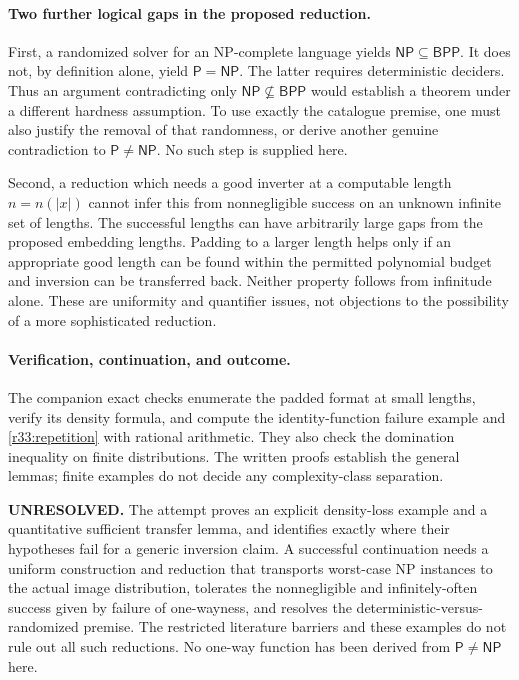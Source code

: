 \documentclass[11pt]{article}
\begin{document}
\paragraph{Two further logical gaps in the proposed reduction.}
First, a randomized solver for an NP-complete language yields
$\mathsf{NP}\subseteq\mathsf{BPP}$. It does not, by definition alone, yield
$\mathsf P=\mathsf{NP}$. The latter requires deterministic deciders.
Thus an argument contradicting only $\mathsf{NP}\not\subseteq\mathsf{BPP}$
would establish a theorem under a different hardness assumption. To use
exactly the catalogue premise, one must also justify the removal of that
randomness, or derive another genuine contradiction to $\mathsf P\ne\mathsf{NP}$.
No such step is supplied here.

Second, a reduction which needs a good inverter at a computable length
$n=n(|x|)$ cannot infer this from nonnegligible success on an unknown
infinite set of lengths. The successful lengths can have arbitrarily
large gaps from the proposed embedding lengths. Padding to a larger
length helps only if an appropriate good length can be found within the
permitted polynomial budget and inversion can be transferred back. Neither
property follows from infinitude alone. These are uniformity and quantifier
issues, not objections to the possibility of a more sophisticated reduction.

\paragraph{Verification, continuation, and outcome.}
The companion exact checks enumerate the padded format at small lengths,
verify its density formula, and compute the identity-function failure
example and \eqref{r33:repetition} with rational arithmetic. They also
check the domination inequality on finite distributions. The written
proofs establish the general lemmas; finite examples do not decide any
complexity-class separation.

\textbf{UNRESOLVED.} The attempt proves an explicit density-loss example
and a quantitative sufficient transfer lemma, and identifies exactly
where their hypotheses fail for a generic inversion claim. A successful
continuation needs a uniform construction and reduction that transports
worst-case NP instances to the actual image distribution, tolerates the
nonnegligible and infinitely-often success given by failure of one-wayness,
and resolves the deterministic-versus-randomized premise. The restricted
literature barriers and these examples do not rule out all such reductions.
No one-way function has been derived from $\mathsf P\ne\mathsf{NP}$ here.
\end{document}
